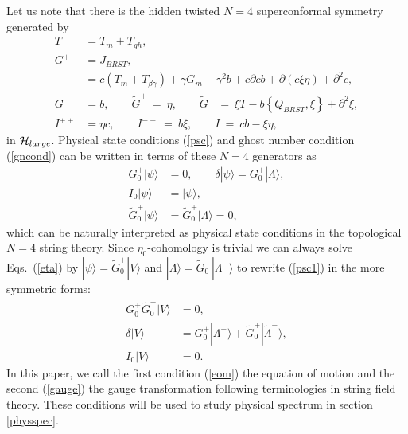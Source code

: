 \documentclass[a4paper,seceq,preprint]{ptptex}
\begin{document}
Let us note that there is the hidden twisted $N=4$ superconformal
symmetry generated by
\begin{align}
 T&=T_m+T_{gh},\nonumber\\
 G^+&=J_{BRST},\nonumber\\
 &= c\left(T_m+T_{\beta\gamma}\right)
+\gamma G_m-\gamma^2b+c\partial cb+\partial(c\xi\eta)+\partial^2c,
\nonumber\\
G^-&=b,\qquad
 \widetilde G^+\ =\ \eta,\qquad
 \widetilde G^-\ =\ \xi T-b\left\{Q_{BRST},\xi\right\}+\partial^2\xi,
\nonumber\\
 I^{++}&=\eta c,\qquad
 I^{--}\ =\ b\xi,\qquad
 I\ =\ cb-\xi\eta,\label{topn4}
\end{align} 
in ${\cal H}_{large}$. Physical state conditions (\ref{psc}) 
and ghost number condition (\ref{gncond}) can be written 
in terms of these $N=4$ generators as
\begin{subequations}\label{psc1}
\begin{align}
 G^+_0|\psi\rangle&=0,\qquad 
\delta|\psi\rangle=G^+_0|\Lambda\rangle,\\
I_0|\psi\rangle&=|\psi\rangle,\\
\widetilde G^+_0|\psi\rangle&=\widetilde G^+_0|\Lambda\rangle=0,
\label{eta}
\end{align}
\end{subequations}
which can be naturally interpreted as physical state conditions
in the topological $N=4$ string theory.\cite{BV}
Since $\eta_0$-cohomology is trivial we can always
solve Eqs.~(\ref{eta}) by $|\psi\rangle=\widetilde G^+_0|V\rangle$ and
$|\Lambda\rangle=\widetilde G^+_0|\Lambda^-\rangle$ 
to rewrite (\ref{psc1}) in the more symmetric forms:
\begin{subequations}\label{phys}
\begin{align}
 G^+_0\widetilde G^+_0|V\rangle&=0,\label{eom}\\
\delta|V\rangle&=G^+_0|\Lambda^-\rangle
+ \widetilde G^+_0|\widetilde\Lambda^-\rangle,\label{gauge}\\
I_0|V\rangle&=0.\label{u1}
\end{align}
\end{subequations}
In this paper, we call the first condition (\ref{eom}) 
the equation of motion and the second (\ref{gauge})
the gauge transformation following terminologies in 
string field theory.
These conditions will be used to study physical spectrum 
in section \ref{physspec}.
\end{document}
